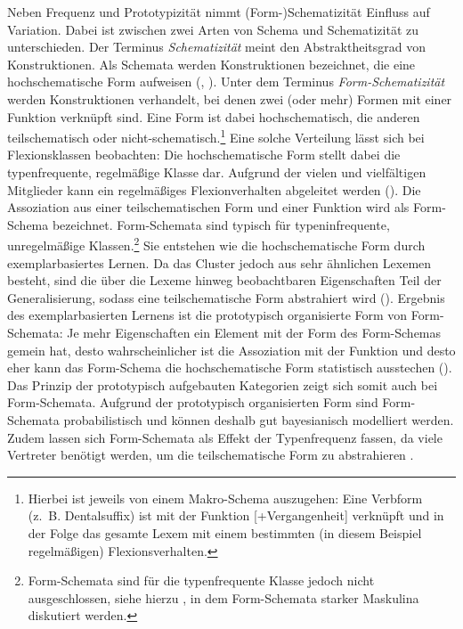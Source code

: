 Neben Frequenz und Prototypizität nimmt (Form-)Schematizität Einfluss auf Variation. Dabei ist zwischen zwei Arten von Schema und Schematizität zu unterschieden. Der Terminus \textit{Schematizität} meint den Abstraktheitsgrad von Konstruktionen. Als Schemata werden Konstruktionen bezeichnet, die eine hochschematische Form aufweisen (\cite[5]{Booij.2010}, \cite[80]{Bybee.2010}). Unter dem Terminus \textit{Form-Schematizität} werden Konstruktionen verhandelt, bei denen zwei (oder mehr) Formen mit einer Funktion verknüpft sind. Eine Form ist dabei hochschematisch, die anderen teilschematisch oder nicht-schematisch.\footnote{Hierbei ist jeweils von einem Makro-Schema auszugehen: Eine Verbform (z.~B. Dentalsuffix) ist mit der Funktion [+Vergangenheit] verknüpft und in der Folge das gesamte Lexem mit einem bestimmten (in diesem Beispiel regelmäßigen) Flexionsverhalten.} Eine solche Verteilung lässt sich bei Flexionsklassen beobachten: Die hochschematische Form stellt dabei die typenfrequente, regelmäßige Klasse dar. Aufgrund der vielen und vielfältigen Mitglieder kann ein regelmäßiges Flexionverhalten abgeleitet werden (\cite[67--68]{Goldberg.2019}).  Die Assoziation aus einer teilschematischen Form und einer Funktion wird als Form-Schema bezeichnet. Form-Schemata sind typisch für typeninfrequente, unregelmäßige Klassen.\footnote{Form-Schemata sind für die typenfrequente Klasse jedoch nicht ausgeschlossen, siehe hierzu , in dem Form-Schemata starker Maskulina diskutiert werden.} Sie entstehen wie die hochschematische Form durch exemplarbasiertes Lernen. Da das Cluster jedoch aus sehr ähnlichen Lexemen besteht, sind die über die Lexeme hinweg beobachtbaren Eigenschaften Teil der Generalisierung, sodass eine teilschematische Form abstrahiert wird (\cite[121]{Goldberg.2019}). Ergebnis des exemplarbasierten Lernens ist die prototypisch organisierte Form von Form-Schemata: Je mehr Eigenschaften ein Element mit der Form des Form-Schemas gemein hat, desto wahrscheinlicher ist die Assoziation mit der Funktion und desto eher kann das Form-Schema die hochschematische Form statistisch ausstechen (\cite{Rumelhart.1980, Bybee.1983, Kopcke.1993}).  Das Prinzip der prototypisch aufgebauten Kategorien zeigt sich somit auch bei Form-Schemata. Aufgrund der prototypisch organisierten Form sind Form-Schemata probabilistisch und können deshalb gut bayesianisch modelliert werden. Zudem lassen sich Form-Schemata als Effekt der Typenfrequenz fassen, da viele Vertreter benötigt werden, um die teilschematische Form zu abstrahieren \parencites[430]{Bybee.1995}[67--69]{Bybee.2010}[67]{Goldberg.2019}. 


